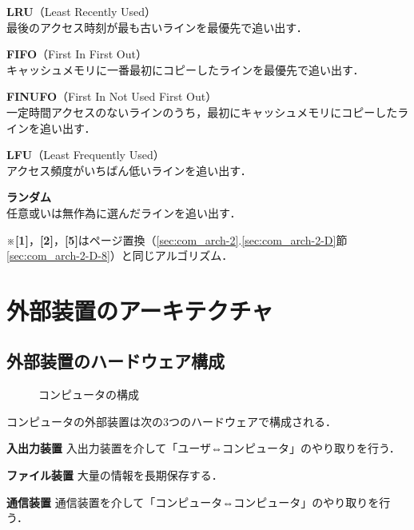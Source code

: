 \begin{enumerate}[label=\textbf{[\arabic*]}, labelsep=10pt, leftmargin=23pt]
	\item \textbf{LRU}（Least Recently Used）\\
		最後のアクセス時刻が最も古いラインを最優先で追い出す．
	\item \textbf{FIFO}（First In First Out）\\
		キャッシュメモリに一番最初にコピーしたラインを最優先で追い出す．
	\item \textbf{FINUFO}（First In Not Used First Out）\\
		一定時間アクセスのないラインのうち，最初にキャッシュメモリにコピーしたラインを追い出す．
	\item \textbf{LFU}（Least Frequently Used）\\
		アクセス頻度がいちばん低いラインを追い出す．
	\item \textbf{ランダム}\\
		任意或いは無作為に選んだラインを追い出す．
\end{enumerate}
※\textbf{[1]}，\textbf{[2]}，\textbf{[5]}はページ置換（\ref{sec:com_arch-2}.\ref{sec:com_arch-2-D}節\ref{sec:com_arch-2-D-8}）と同じアルゴリズム．



\section{外部装置のアーキテクチャ}\label{sec:com_arch-3}
\subsection{外部装置のハードウェア構成}\label{sec:com_arch-3-A}

\begin{figure}[H]
	\begin{center}
		\caption{コンピュータの構成}
		\label{fig:com_arch-11}
	\end{center}
\end{figure}

コンピュータの外部装置は次の3つのハードウェアで構成される．

\begin{enumerate}[label=\textbf{[\arabic*]}, labelsep=10pt, leftmargin=23pt]
	\item \textbf{入出力装置}\hspace*{3\zw} 入出力装置を介して「ユーザ⇔コンピュータ」のやり取りを行う．
	\item \textbf{ファイル装置}\hspace*{2\zw} 大量の情報を長期保存する．
	\item \textbf{通信装置}\hspace*{4\zw} 通信装置を介して「コンピュータ⇔コンピュータ」のやり取りを行う．
\end{enumerate}

